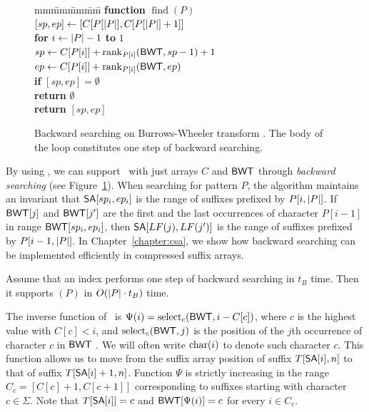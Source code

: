 \begin{figure}
\begin{tabbing}
mm\=mm\=mm\=mm\= \kill
\> \textbf{function} $\operatorname{find}(P)$ \\
\> \> $[sp, ep] \leftarrow [C[P[\lvert P \rvert], C[P[\lvert P \rvert] + 1]]$ \\
\> \> \textbf{for} $i \leftarrow \lvert P \rvert-1$ \textbf{to} $1$ \\
\> \> \> $sp \leftarrow C[P[i]] + \operatorname{rank}_{P[i]}(\mathsf{BWT}, sp - 1) + 1$ \\
\> \> \> $ep \leftarrow C[P[i]] + \operatorname{rank}_{P[i]}(\mathsf{BWT}, ep)$ \\
\> \> \> \textbf{if} $[sp, ep] = \emptyset$ \\
\> \> \> \> \textbf{return} $\emptyset$ \\
\> \> \textbf{return} $[sp, ep]$
\end{tabbing}

\caption{Backward searching on Burrows-Wheeler transform \cite{Ferragina2005a}. The body of the loop constitutes one step of backward searching.}\label{fig:backward searching}
\end{figure}

By using \LF, we can support \find\ with just arrays $C$ and $\mathsf{BWT}$ through \emph{backward searching} \cite{Ferragina2005a} (see Figure~\ref{fig:backward searching}). When searching for pattern $P$, the algorithm maintains an invariant that $\mathsf{SA}[sp_{i}, ep_{i}]$ is the range of suffixes prefixed by $P[i,\lvert P \rvert]$. If $\mathsf{BWT}[j]$ and $\mathsf{BWT}[j']$ are the first and the last occurrences of character $P[i-1]$ in range $\mathsf{BWT}[sp_{i}, ep_{i}]$, then $\mathsf{SA}[LF(j), LF(j')]$ is the range of suffixes prefixed by $P[i-1,\lvert P \rvert]$. In Chapter~\ref{chapter:csa}, we show how backward searching can be implemented efficiently in compressed suffix arrays.

\begin{theorem}\label{theorem:backward searching}
Assume that an index performs one step of backward searching in $t_{B}$ time. Then it supports \find$(P)$ in $O(\lvert P \rvert \cdot t_{B})$ time. 
\end{theorem}

The inverse function of \LF\ is $\Psi(i) = \operatorname{select}_{c}(\mathsf{BWT}, i - C[c])$, where $c$ is the highest value with $C[c] < i$, and $\operatorname{select}_{c}(\mathsf{BWT},j)$ is the position of the $j$th occurrence of character $c$ in $\mathsf{BWT}$ \cite{Grossi2005}. We will often write $\operatorname{char}(i)$ to denote such character $c$. This function allows us to move from the suffix array position of suffix $T[\mathsf{SA}[i], n]$ to that of suffix $T[\mathsf{SA}[i]+1, n]$. Function $\Psi$ is strictly increasing in the range $C_{c} = [C[c] + 1, C[c+1]]$ corresponding to suffixes starting with character $c \in \Sigma$. Note that $T[\mathsf{SA}[i]] = c$ and $\mathsf{BWT}[\Psi(i)] = c$ for every $i \in C_{c}$.

